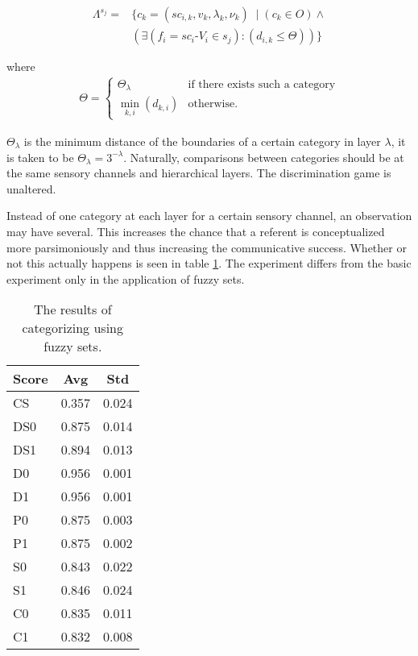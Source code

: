 \begin{eqnarray}
\Lambda^{s_j}=&\{c_k=(sc_{i,k},v_k,\lambda_k,\nu_k)\; \mid (c_k \in O) \wedge \\\nonumber
&(\exists (f_i=sc_i\mbox{-}V_i \in s_j):(d_{i,k} \leq \Theta))\}
\end{eqnarray}

\n
where
\begin{eqnarray}
\Theta = \left \{\begin{array}{rl}
\Theta_\lambda & \mbox{if there exists such a category}\\
\min_{k,i} (d_{k,i}) & \mbox{otherwise.}
\end{array} \right.
\end{eqnarray}

\n
$\Theta_\lambda$ is the minimum distance of the boundaries of a certain category in layer $\lambda$, it is taken to be $\Theta_\lambda=3^{-\lambda}$. Naturally, comparisons between categories should be at the same sensory channels and hierarchical layers. The discrimination game is unaltered.

Instead of one category at each layer for a certain sensory channel, an observation may have several. This increases the chance that a referent is conceptualized more parsimoniously and thus increasing the communicative success. Whether or not this actually happens is seen in table \ref{t:cat:fs}. The experiment differs from the basic experiment only in the application of fuzzy sets.

\begin{table}
\centering
\begin{tabular}{||l|c|c||}
\hline\hline
Score & Avg & Std\\\hline
CS & 0.357 & 0.024\\\hline
DS0 & 0.875 & 0.014\\\hline
DS1 & 0.894 & 0.013\\\hline
D0 & 0.956 & 0.001\\\hline
D1 & 0.956 & 0.001\\\hline
P0 & 0.875 & 0.003\\\hline
P1 & 0.875 & 0.002\\\hline
S0 & 0.843 & 0.022\\\hline
S1 & 0.846 & 0.024\\\hline
C0 & 0.835 & 0.011\\\hline
C1 & 0.832 & 0.008\\\hline
\hline
\end{tabular}
\caption{The results of categorizing using fuzzy sets.}
\label{t:cat:fs}
\end{table}


